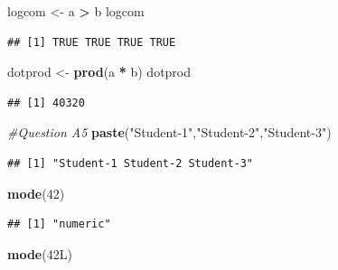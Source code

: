 \documentclass[
]{article}
\newenvironment{Shaded}{\begin{snugshade}}{\end{snugshade}}
\newcommand{\CommentTok}[1]{\textcolor[rgb]{0.56,0.35,0.01}{\textit{#1}}}
\newcommand{\DataTypeTok}[1]{\textcolor[rgb]{0.13,0.29,0.53}{#1}}
\newcommand{\DecValTok}[1]{\textcolor[rgb]{0.00,0.00,0.81}{#1}}
\newcommand{\FunctionTok}[1]{\textcolor[rgb]{0.13,0.29,0.53}{\textbf{#1}}}
\newcommand{\NormalTok}[1]{#1}
\newcommand{\OtherTok}[1]{\textcolor[rgb]{0.56,0.35,0.01}{#1}}
\newcommand{\SpecialCharTok}[1]{\textcolor[rgb]{0.81,0.36,0.00}{\textbf{#1}}}
\newcommand{\StringTok}[1]{\textcolor[rgb]{0.31,0.60,0.02}{#1}}
\begin{document}
\begin{Shaded}
\begin{Highlighting}[]
\NormalTok{logcom }\OtherTok{\textless{}{-}}\NormalTok{ a }\SpecialCharTok{\textgreater{}}\NormalTok{ b}
\NormalTok{logcom}
\end{Highlighting}
\end{Shaded}

\begin{verbatim}
## [1] TRUE TRUE TRUE TRUE
\end{verbatim}

\begin{Shaded}
\begin{Highlighting}[]
\NormalTok{dotprod }\OtherTok{\textless{}{-}} \FunctionTok{prod}\NormalTok{(a }\SpecialCharTok{*}\NormalTok{ b)}
\NormalTok{dotprod}
\end{Highlighting}
\end{Shaded}

\begin{verbatim}
## [1] 40320
\end{verbatim}

\begin{Shaded}
\begin{Highlighting}[]
\CommentTok{\#Question A5}
 \FunctionTok{paste}\NormalTok{(}\StringTok{"Student{-}1"}\NormalTok{,}\StringTok{"Student{-}2"}\NormalTok{,}\StringTok{"Student{-}3"}\NormalTok{)}
\end{Highlighting}
\end{Shaded}

\begin{verbatim}
## [1] "Student-1 Student-2 Student-3"
\end{verbatim}

\begin{Shaded}
\begin{Highlighting}[]
 \FunctionTok{mode}\NormalTok{(}\DecValTok{42}\NormalTok{)}
\end{Highlighting}
\end{Shaded}

\begin{verbatim}
## [1] "numeric"
\end{verbatim}

\begin{Shaded}
\begin{Highlighting}[]
 \FunctionTok{mode}\NormalTok{(}\DecValTok{42}\DataTypeTok{L}\NormalTok{)}
\end{Highlighting}
\end{Shaded}
\end{document}
